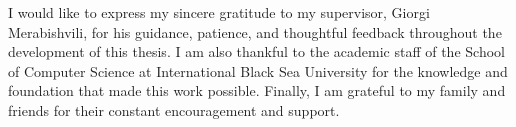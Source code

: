 I would like to express my sincere gratitude to my supervisor, Giorgi
Merabishvili, for his guidance, patience, and thoughtful feedback throughout the
development of this thesis. I am also thankful to the academic staff of the
School of Computer Science at International Black Sea University for the
knowledge and foundation that made this work possible. Finally, I am grateful to
my family and friends for their constant encouragement and support.
